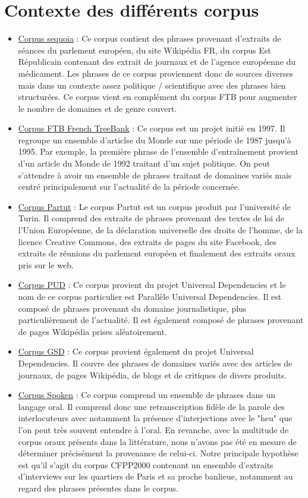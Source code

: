 \documentclass[french, 14pt]{memoir}
\begin{document}
\section{Contexte des différents corpus}
\begin{itemize}
\item \underline{Corpus sequoia} : Ce corpus contient des phrases provenant d'extraits de séances du parlement européen, du site Wikipédia FR, du corpus Est Républicain contenant des extrait de journaux et de l'agence européenne du médicament. Les phrases de ce corpus proviennent donc de sources diverses mais dans un contexte assez politique / scientifique avec des phrases bien structurées. Ce corpus vient en complément du corpus FTB pour augmenter le nombre de domaines et de genre couvert. 

\item \underline{Corpus FTB French TreeBank} : Ce corpus est un projet initié en 1997. Il regroupe un ensemble d'articlse du Monde sur une période de 1987 jusqu'à 1995. Par exemple, la première phrase de l'ensemble d'entraînement provient d'un article du Monde de 1992 traitant d'un sujet politique. On peut s'attendre à avoir un ensemble de phrases traitant de domaines variés mais centré principalement sur l'actualité de la période concernée. 

\item \underline{Corpus Partut} : Le corpus Partut est un corpus produit par l'université de Turin. Il comprend des extraits de phrases provenant des textes de loi de l'Union Européenne, de la déclaration universelle des droits de l'homme, de la licence Creative Commons, des extraits de pages du site Facebook, des extraits de réunions du parlement européen et finalement des extraits oraux pris sur le web.

\item \underline{Corpus PUD} : Ce corpus provient du projet Universal Dependencies et le nom de ce corpus particulier est Parallèle Universal Dependencies. Il est composé de phrases provenant du domaine journalistique, plus particulièrement de l'actualité. Il est également composé de phrases provenant de pages Wikipédia prises aléatoirement.

\item \underline{Corpus GSD} : Ce corpus provient également du projet Universal Dependencies. Il couvre des phrases de domaines variés avec des articles de journaux, de pages Wikipédia, de blogs et de critiques de divers produits.

\item \underline{Corpus Spoken} : Ce corpus comprend un ensemble de phrases dans un langage oral. Il comprend donc une retranscription fidèle de la parole des interlocuteurs avec notamment la présence d'interjections avec le "heu" que l'on peut très souvent entendre à l'oral. En revanche, avec la multitude de corpus oraux présents dans la littérature, nous n'avons pas été en mesure de déterminer précisément la provenance de celui-ci. Notre principale hypothèse est qu'il s'agit du corpus CFPP2000 contenant un ensemble d'extraits d'interviews sur les quartiers de Paris et sa proche banlieue, notamment au regard des phrases présentes dans le corpus. 
\end{itemize}
\end{document}
